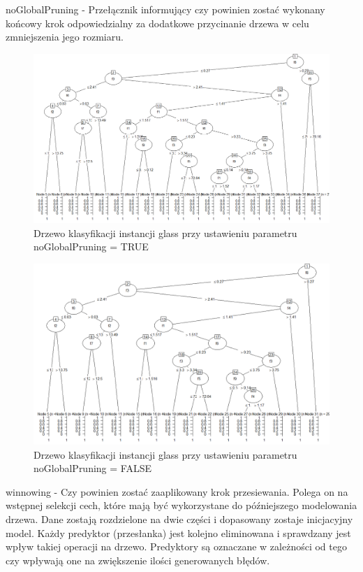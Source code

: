 \documentclass[12pt,a4paper]{article}
\begin{document}
noGlobalPruning - Przełącznik informujący czy powinien zostać wykonany końcowy krok odpowiedzialny za dodatkowe przycinanie drzewa w celu zmniejszenia jego rozmiaru.

\begin{figure}[H]
\centering
\includegraphics[width=1\textwidth]{no_GP_Glass.png}
\caption{Drzewo klasyfikacji instancji glass przy ustawieniu parametru noGlobalPruning = TRUE}
\end{figure}

\begin{figure}[H]
\centering
\includegraphics[width=1\textwidth]{GP_Glass.png}
\caption{Drzewo klasyfikacji instancji glass przy ustawieniu parametru noGlobalPruning = FALSE}
\end{figure}

winnowing - Czy powinien zostać zaaplikowany krok przesiewania. Polega on na wstępnej selekcji cech, które mają być wykorzystane do późniejszego modelowania drzewa. Dane zostają rozdzielone na dwie części i dopasowany zostaje inicjacyjny model. Każdy predyktor (przesłanka) jest kolejno eliminowana i sprawdzany jest wpływ takiej operacji na drzewo. Predyktory są oznaczane w zależności od tego czy wpływają one na zwiększenie ilości generowanych błędów.
\end{document}
